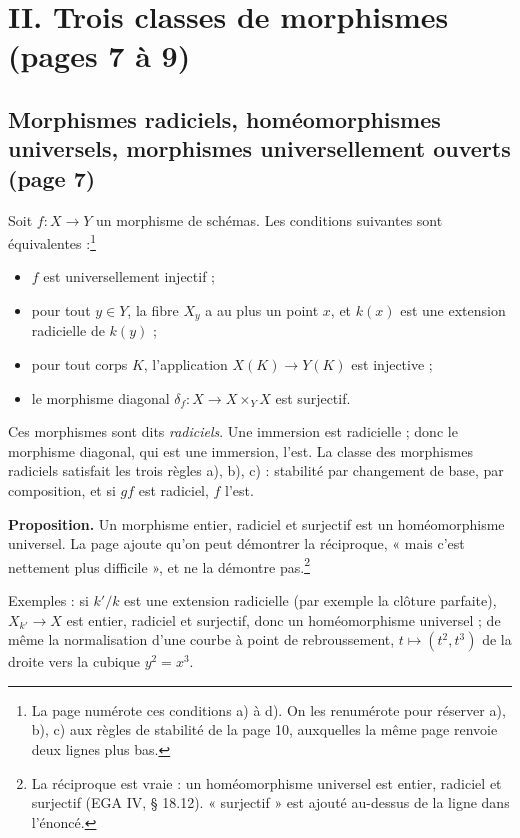 \documentclass[11pt,a4paper]{article}
\begin{document}
\section*{II. Trois classes de morphismes (pages 7 à 9)}

\subsection*{Morphismes radiciels, homéomorphismes universels, morphismes universellement ouverts (page 7)}

Soit $f : X \to Y$ un morphisme de schémas. Les conditions suivantes sont
équivalentes :\footnote{La page numérote ces conditions a) à d). On les
renumérote pour réserver a), b), c) aux règles de stabilité de la page 10,
auxquelles la même page renvoie deux lignes plus bas.}

\begin{itemize}
  \item[(i)] $f$ est universellement injectif ;
  \item[(ii)] pour tout $y \in Y$, la fibre $X_y$ a au plus un point $x$, et
  $k(x)$ est une extension radicielle de $k(y)$ ;
  \item[(iii)] pour tout corps $K$, l'application $X(K) \to Y(K)$ est
  injective ;
  \item[(iv)] le morphisme diagonal $\delta_f : X \to X \times_Y X$ est
  surjectif.
\end{itemize}

Ces morphismes sont dits \emph{radiciels}. Une immersion est radicielle ; donc
le morphisme diagonal, qui est une immersion, l'est. La classe des morphismes
radiciels satisfait les trois règles a), b), c) : stabilité par changement de
base, par composition, et si $gf$ est radiciel, $f$ l'est.

\textbf{Proposition.} Un morphisme entier, radiciel et surjectif est un
homéomorphisme universel. La page ajoute qu'on peut démontrer la réciproque,
« mais c'est nettement plus difficile », et ne la démontre pas.\footnote{La
réciproque est vraie : un homéomorphisme universel est entier, radiciel et
surjectif (EGA IV, § 18.12). « surjectif » est ajouté au-dessus de la ligne dans
l'énoncé.}

Exemples : si $k'/k$ est une extension radicielle (par exemple la clôture
parfaite), $X_{k'} \to X$ est entier, radiciel et surjectif, donc un
homéomorphisme universel ; de même la normalisation d'une courbe à point de
rebroussement, $t \mapsto (t^2, t^3)$ de la droite vers la cubique
$y^2 = x^3$.
\end{document}
